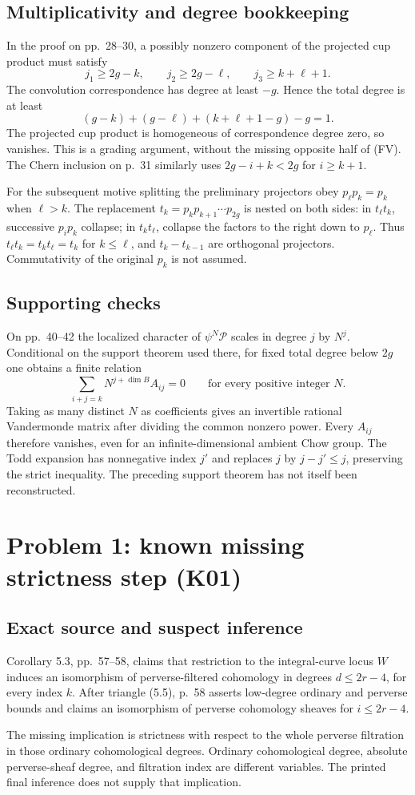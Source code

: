\documentclass[10pt]{article}
\begin{document}
\subsection*{Multiplicativity and degree bookkeeping}
In the proof on pp. 28–30, a possibly nonzero component of the projected cup product must satisfy \[j_1\geq2g-k,\qquad j_2\geq2g-\ell,\qquad j_3\geq k+\ell+1.\] The convolution correspondence has degree at least \(-g\). Hence the total degree is at least \[(g-k)+(g-\ell)+(k+\ell+1-g)-g=1.\] The projected cup product is homogeneous of correspondence degree zero, so vanishes. This is a grading argument, without the missing opposite half of (FV). The Chern inclusion on p. 31 similarly uses \(2g-i+k<2g\) for \(i\geq k+1\).\par
For the subsequent motive splitting the preliminary projectors obey \(p_\ell p_k=p_k\) when \(\ell>k\). The replacement \(t_k=p_kp_{k+1}\cdots p_{2g}\) is nested on both sides: in \(t_\ell t_k\), successive \(p_i p_k\) collapse; in \(t_k t_\ell\), collapse the factors to the right down to \(p_\ell\). Thus \(t_\ell t_k=t_k t_\ell=t_k\) for \(k\leq\ell\), and \(t_k-t_{k-1}\) are orthogonal projectors. Commutativity of the original \(p_k\) is not assumed.\par
\subsection*{Supporting checks}
On pp. 40–42 the localized character of \(\psi^N\mathcal P\) scales in degree \(j\) by \(N^j\). Conditional on the support theorem used there, for fixed total degree below \(2g\) one obtains a finite relation \[\sum_{i+j=k}N^{j+\dim B}A_{ij}=0
 \qquad\text{for every positive integer }N.\] Taking as many distinct \(N\) as coefficients gives an invertible rational Vandermonde matrix after dividing the common nonzero power. Every \(A_{ij}\) therefore vanishes, even for an infinite-dimensional ambient Chow group. The Todd expansion has nonnegative index \(j'\) and replaces \(j\) by \(j-j'\leq j\), preserving the strict inequality. The preceding support theorem has not itself been reconstructed.\par
\section*{Problem 1: known missing strictness step (K01)}
\subsection*{Exact source and suspect inference}
Corollary 5.3, pp. 57–58, claims that restriction to the integral-curve locus \(W\) induces an isomorphism of perverse-filtered cohomology in degrees \(d\leq2r-4\), for every index \(k\). After triangle (5.5), p. 58 asserts low-degree ordinary and perverse bounds and claims an isomorphism of perverse cohomology sheaves for \(i\leq2r-4\).\par
The missing implication is strictness with respect to the whole perverse filtration in those ordinary cohomological degrees. Ordinary cohomological degree, absolute perverse-sheaf degree, and filtration index are different variables. The printed final inference does not supply that implication.\par
\end{document}
